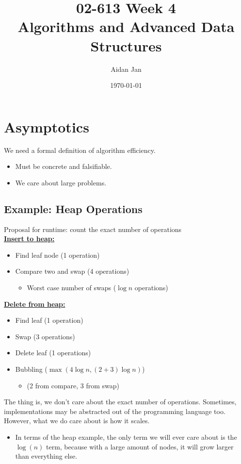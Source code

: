 \documentclass[10pt]{article}
\title{02-613 Week 4 \\ \large{Algorithms and Advanced Data Structures}}
\author{Aidan Jan}
\date{\today}
\begin{document}
\maketitle

\section*{Asymptotics}
We need a formal definition of algorithm efficiency.
\begin{itemize}
	\item Must be concrete and falsifiable.
	\item We care about large problems.
\end{itemize}

\subsection*{Example: Heap Operations}
Proposal for runtime: count the exact number of operations\\
\underline{\textbf{Insert to heap:}}
\begin{itemize}
	\item Find leaf node (1 operation)
	\item Compare two and swap (4 operations)
	\begin{itemize}
	    \item Worst case number of swaps ($\log n$ operations)
    \end{itemize}
\end{itemize}
\underline{\textbf{Delete from heap:}}
\begin{itemize}
	\item Find leaf (1 operation)
	\item Swap (3 operations)
	\item Delete leaf (1 operations)
	\item Bubbling ($\max(4 \log n, (2 + 3) \log n)$)
	\begin{itemize}
	    \item (2 from compare, 3 from swap)
    \end{itemize}
\end{itemize}
The thing is, we don't care about the exact number of operations.  Sometimes, implementations may be abstracted out of the programming language too.  However, what we do care about is how it scales.
\begin{itemize}
	\item In terms of the heap example, the only term we will ever care about is the $\log(n)$ term, because with a large amount of nodes, it will grow larger than everything else.
\end{itemize}
\end{document}
